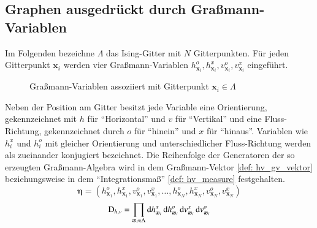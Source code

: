 \subsection{Graphen ausgedrückt durch Graßmann-Variablen } \label{sec: GraßmanGraphs}

\noindent Im Folgenden bezeichne  $\Lambda$ das Ising-Gitter mit $N$ Gitterpunkten. Für jeden Gitterpunkt $\bm{x}_i$ werden vier Graßmann-Variablen $h_{\bm{x}_i}^o, h_{\bm{x}_i}^x, v_{\bm{x}_i}^o, v_{\bm{x}_i}^x$ eingeführt. 
\begin{figure}[h]
\centering
{}
\caption{Graßmann-Variablen assoziiert mit Gitterpunkt $\bm{x}_i\in\Lambda$}
\label{Abb: graßmanVariableBeiI}
\end{figure}

\noindent Neben der Position am Gitter besitzt jede Variable eine Orientierung, gekennzeichnet mit $h$ für ``Horizontal'' und $v$ für ``Vertikal'' und eine Fluss-Richtung, gekennzeichnet durch $o$ für ``hinein'' und $x$ für ``hinaus''. Variablen wie $h_{i}^x$ und $h_{i}^o$  mit gleicher Orientierung und unterschiedlicher Fluss-Richtung werden als zueinander konjugiert bezeichnet. Die Reihenfolge der Generatoren der so erzeugten Graßmann-Algebra wird in dem Graßmann-Vektor \eqref{def: hv_gv_vektor} beziehungsweise in dem ``Integrationsmaß'' \eqref{def: hv_measure} festgehalten.
\begin{equation} \label{def: hv_gv_vektor}
\bm{\eta} = \left(h_{\bm{x}_1}^o, h_{\bm{x}_1}^x, v_{\bm{x}_1}^o, v_{\bm{x}_1}^x, \dots, h_{\bm{x}_N}^o, h_{\bm{x}_N}^x, v_{\bm{x}_N}^o, v_{\bm{x}_N}^x \right)
\end{equation}
\begin{equation} \label{def: hv_measure}
\mathrm{D}_{h,v} = \prod_{\bm{x}_i \in \Lambda} \mathrm{d} h_{\bm{x}_i}^x\,\mathrm{d} h_{\bm{x}_i}^o\,\mathrm{d} v_{\bm{x}_i}^x\,\mathrm{d} v_{\bm{x}_i}^o \\
\end{equation}

